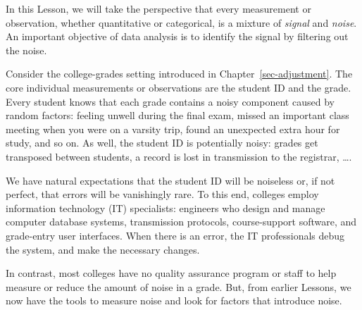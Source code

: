 \documentclass[
  letterpaper,
  DIV=11,
  numbers=noendperiod,
  oneside]{scrartcl}
\begin{document}
In this Lesson, we will take the perspective that every measurement or
observation, whether quantitative or categorical, is a mixture of
\emph{signal} and \emph{noise}. An important objective of data analysis
is to identify the signal by filtering out the noise.

Consider the college-grades setting introduced in
Chapter~\ref{sec-adjustment}. The core individual measurements or
observations are the student ID and the grade. Every student knows that
each grade contains a noisy component caused by random factors: feeling
unwell during the final exam, missed an important class meeting when you
were on a varsity trip, found an unexpected extra hour for study, and so
on. As well, the student ID is potentially noisy: grades get transposed
between students, a record is lost in transmission to the registrar,
\ldots.

We have natural expectations that the student ID will be noiseless or,
if not perfect, that errors will be vanishingly rare. To this end,
colleges employ information technology (IT) specialists: engineers who
design and manage computer database systems, transmission protocols,
course-support software, and grade-entry user interfaces. When there is
an error, the IT professionals debug the system, and make the necessary
changes.

In contrast, most colleges have no quality assurance program or staff to
help measure or reduce the amount of noise in a grade. But, from earlier
Lessons, we now have the tools to measure noise and look for factors
that introduce noise.
\end{document}
